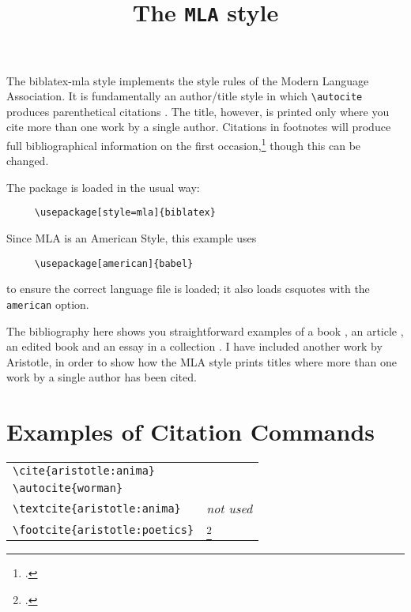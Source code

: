 \documentclass{article}
\begin{document}
\title{The \texttt{MLA} style}
\author{}\date{}
\maketitle
\thispagestyle{empty}

\noindent
The \textsf{biblatex-mla} style implements the style rules of the Modern Language Association. It is fundamentally an author/title style in which \verb~\autocite~ produces parenthetical citations \autocite{worman}. The title, however, is printed only where you cite more than one work by a single author. Citations in footnotes will produce full bibliographical information on the first occasion,\footcite{aristotle:poetics} though this can be changed.

The package is loaded in the usual way:
\begin{verbatim}
     \usepackage[style=mla]{biblatex}
\end{verbatim}
Since MLA is an American Style, this example uses
\begin{verbatim}
     \usepackage[american]{babel}
\end{verbatim}
to ensure the correct language file is loaded; it also loads \textsf{csquotes} with the \verb~american~ option.

The bibliography here shows you straightforward examples of a book \autocite{worman}, an article \autocite{reese}, an edited book \autocite{aristotle:anima} and an essay in a collection \autocite{gaonkar:in}. I have included another work by Aristotle, in order to show how the MLA style prints titles where more than one work by a single author has been cited.

\section*{Examples of Citation Commands}

\begin{tabular}{ll}
\verb|\cite{aristotle:anima}| & \cite{aristotle:anima} \\
\verb|\autocite{worman}| & \autocite{worman} \\
\verb|\textcite{aristotle:anima}| & \emph{not used} \\
\verb|\footcite{aristotle:poetics}| & \strut\footcite{aristotle:poetics}
\end{tabular}

\printbibliography
\end{document}
